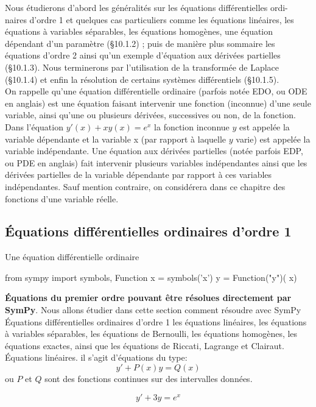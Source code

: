 Nous étudierons d’abord les généralités sur les équations différentielles ordi-
naires d’ordre 1 et quelques cas particuliers comme les équations linéaires, les
équations à variables séparables, les équations homogènes, une équation dépendant
d’un paramètre (§10.1.2) ; puis de manière plus sommaire les équations d’ordre 2
ainsi qu’un exemple d’équation aux dérivées partielles (§10.1.3). Nous terminerons
par l’utilisation de la transformée de Laplace (§10.1.4) et enfin la résolution de
certains systèmes différentiels (§10.1.5).
\\
On rappelle qu’une équation différentielle ordinaire (parfois notée EDO, ou
ODE en anglais) est une équation faisant intervenir une fonction (inconnue)
d’une seule variable, ainsi qu’une ou plusieurs dérivées, successives ou non, de la
fonction.
\\
Dans l’équation $y'(x) + x y\left(x\right) = e^{x}$ la fonction inconnue $y$ est appelée la
variable dépendante et la variable x (par rapport à laquelle $y$ varie) est appelée la
variable indépendante.
Une équation aux dérivées partielles (notée parfois EDP, ou PDE en anglais)
fait intervenir plusieurs variables indépendantes ainsi que les dérivées partielles
de la variable dépendante par rapport à ces variables indépendantes.
Sauf mention contraire, on considérera dans ce chapitre des fonctions d’une variable réelle.

 \subsection{Équations différentielles ordinaires d’ordre 1}
\begin{definition}
Une équation différentielle ordinaire
\end{definition}

\begin{python}
from sympy import symbols, Function
x = symbols('x')
y = Function("y")( x)
\end{python}

\textbf{Équations du premier ordre pouvant être résolues directement par SymPy}. Nous allons étudier dans cette section comment résoudre avec SymPy Équations différentielles ordinaires d’ordre 1
les équations linéaires, les équations à variables séparables, les équations de Bernoulli, les équations homogènes, les équations exactes, ainsi que les équations de Riccati,
Lagrange et Clairaut.
\\
Équations linéaires. il s'agit d’équations du type:
  \[
  y'+ P(x)y = Q(x) 
  \] 
ou $P$ et $Q$ sont des fonctions continues sur des intervalles données.
\begin{example}
 \[
   y' + 3y = e^{x}
 \]
\end{example}
